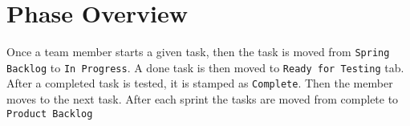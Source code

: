 \section{Phase  Overview}
Once a team member starts a given task, then the task is moved from {\tt Spring Backlog} to {\tt In Progress}. A done task is then moved to {\tt Ready for Testing} tab. After a completed task is tested, it is stamped as {\tt Complete}. Then the member moves to the next task. After each sprint the tasks are moved from complete to {\tt Product Backlog}

 
